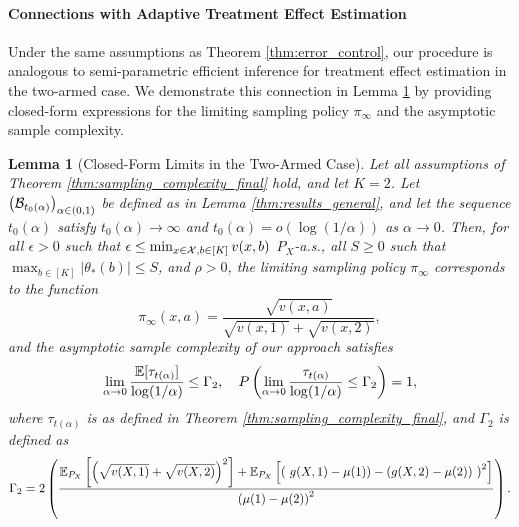 \documentclass{article}
\newtheorem{lemma}{Lemma}
\begin{document}
\paragraph{Connections with Adaptive Treatment Effect Estimation} Under the same assumptions as Theorem \ref{thm:error_control}, our procedure is analogous to semi-parametric efficient inference for treatment effect estimation \citep{cook2024semiparametricefficientinferenceadaptive} in the two-armed case. We demonstrate this connection in Lemma \ref{lem:two_armed} by providing closed-form expressions for the limiting sampling policy $\pi_\infty$ and the asymptotic sample complexity. 


\begin{lemma}[Closed-Form Limits in the Two-Armed Case]\label{lem:two_armed}
    Let all assumptions of Theorem \ref{thm:sampling_complexity_final} hold, and let $K=2$. Let $\left(\mathcal{B}_{t_0(\alpha)}\right)_{\alpha \in (0,1)}$ be defined as in Lemma \ref{thm:results_general}, and let the sequence $t_0(\alpha)$ satisfy $t_0(\alpha) \rightarrow \infty$ and $t_0(\alpha) = o(\log(1/\alpha))$ as $\alpha \rightarrow 0$. Then, for all $\epsilon >0$ such that $\epsilon \leq \min_{x \in \mathcal{X}, b \in [K]}v(x,b)$ $P_X$-a.s., all $S \geq 0$ such that $\max_{b \in [K]} |\theta_*(b)| \leq S$, and $\rho >0$, the limiting sampling policy $\pi_{\infty}$ corresponds to the function 
    \begin{equation}
        \pi_\infty(x,a) = \frac{\sqrt{v(x,a)}}{\sqrt{v(x,1)} + \sqrt{v(x,2)}},
    \end{equation}
    and the asymptotic sample complexity of our approach satisfies 
    \begin{equation}
        \lim_{\alpha \rightarrow 0} \frac{\mathbb{E}[\tau_{t(\alpha)}]} {\log(1/\alpha)} \leq \Gamma_2, \quad P\left(\lim_{\alpha \rightarrow 0} \frac{\tau_{t(\alpha)}} {\log(1/\alpha)} \leq \Gamma_2 \right) = 1,
    \end{equation}
    where $\tau_{t(\alpha)}$ is as defined in Theorem \ref{thm:sampling_complexity_final}, and $\Gamma_2$ is defined as 
    \begin{equation}
        \Gamma_2 = 2\left(\frac{\mathbb{E}_{P_X}\left[ \left( \sqrt{v(X,1)} + \sqrt{v(X,2)} \right)^2 \right] + \mathbb{E}_{P_X}\left[ \left( \ g(X,1) - \mu(1)) - (g(X, 2)- \mu(2)) \ \right)^2 \right]}{\left(\mu(1) - \mu(2)\right)^2}\right).
    \end{equation}
\end{lemma}
\end{document}
